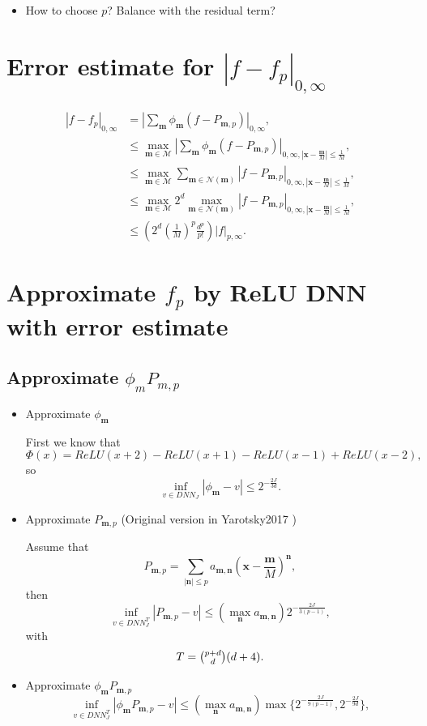 \begin{itemize}
	\item How to choose $p$? Balance with the residual term?
\end{itemize}

\section{Error estimate for $|f - f_p|_{0,\infty}$}
\begin{align*}\label{fperoor}
|f - f_p|_{0,\infty} &= |\sum_{\bm m} \phi_{\bm m}(f - P_{{\bm m}, p})|_{0, \infty},  \\
&\le \max_{{\bm m} \in \mathcal{M}}  |\sum_{\bm m} \phi_{\bm m}(f - P_{{\bm m}, p})|_{0, \infty,  |{\bm x} - \frac{\bm m}{M}| \le {\frac{1}{M}}}, \\
&\le \max_{{\bm m} \in \mathcal{M}} \sum_{ {\bm m} \in \mathcal{N}({\bm m})} |f - P_{{\bm m}, p}|_{0,\infty, |{\bm x} - \frac{\bm m}{M}| \le {\frac{1}{M}}}, \\
&\le \max_{{\bm m} \in \mathcal{M}}  2^d \max_{{\bm m} \in \mathcal{N}({\bm m})} |f - P_{{\bm m}, p}|_{0,\infty, |{\bm x} - \frac{\bm m}{M}| \le {\frac{1}{M}}}, \\
&\le \left( 2^{d} \left( \frac{1}{M} \right)^p \frac{d^p}{ p!} \right)|f|_{p, \infty}.
\end{align*}

\section{Approximate $f_p$ by ReLU DNN with error estimate}
\subsection{Approximate $\phi_m P_{m, p}$}
\begin{itemize}
	\item Approximate $\phi_{\bm m}$ 
	
	First we know that 
	$$
	\Phi(x) = ReLU(x+2) - ReLU(x+1) - ReLU(x-1) + ReLU(x-2),
	$$ 
	so 
	$$
	\inf_{v \in DNN_{J}} |\phi_{\bm m} - v| \le 2^{-\frac{2J}{3d}}.
	$$
	\item Approximate $P_{{\bm m}, p}$ (Original version in Yarotsky2017 )
	
	Assume that 
	$$
	P_{{\bm m}, p} = \sum_{|{\bm n}| \le p}a_{\bm m, \bm n} {(\bm x - \frac{\bm m}{M})}^{\bm n},
	$$
	then 
	$$
	\inf_{v \in DNN^{T}_{J}} |P_{{\bm m}, p} - v| \le (\max_{ \bm n} a_{\bm m,\bm n})2^{-\frac{2J}{3(p-1)}},
	$$
	with 
	$$
	T = \tbinom{p+d}{d}(d+4).
	$$
	
	\item Approximate $\phi_{\bm m} P_{\bm m, p}$
	$$
	\inf_{v \in DNN^{T}_{J}} |\phi_{\bm m} P_{\bm m, p} - v| \le (\max_{ \bm n} a_{\bm m,\bm n}) \max\{2^{-\frac{2J}{9(p-1)}},  2^{-\frac{2J}{9d}}\},
	$$
\end{itemize}

